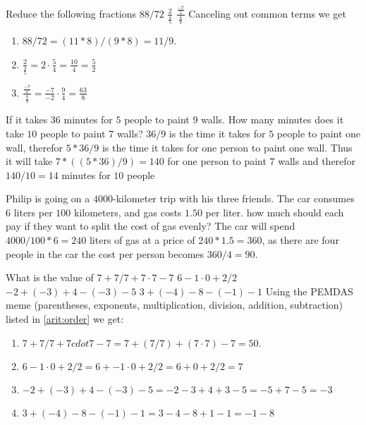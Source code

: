 \begin{ExerciseList}

\Exercise Reduce the following fractions
\Question $88/72$
\Question $\frac{2}{\frac{4}{5}}$
\Question $\frac{\frac{-7}{2}}{\frac{4}{9}}$
\Answer Canceling out common terms we get
\begin{enumerate}
\item\myindent $88/72 = (11*8)/(9*8) = 11/9$.
\item\myindent $\frac{2}{\frac{4}{5}} = 2 \cdot \frac{5}{4} = \frac{10}{4} = \frac{5}{2}$
\item\myindent $\frac{\frac{-7}{2}}{\frac{4}{9}} = \frac{-7}{-2} \cdot \frac{9}{4} = \frac{63}{8}$
\end{enumerate}

\Exercise If it takes 36 minutes for $5$ people to paint $9$ walls. How many minutes does it take $10$ people to paint $7$ walls?
\Answer $36/9$ is the time it takes for $5$ people to paint one wall, therefor $5 * 36/9$ is the time it takes for one person to paint one wall. Thus it will take $7 * ((5 * 36)/9) = 140$ for one person to paint $7$ walls and therefor $140/10 = 14$ minutes for $10$ people

\Exercise Philip is going on a $4000$-kilometer trip with his three friends. The car consumes $6$ liters per $100$ kilometers, and gas costs $1.50$ per liter. how much should each pay if they want to split the cost of gas evenly?
\Answer The car will spend $4000/100 * 6 = 240$ liters of gas at a price of $240 * 1.5 = 360$, as there are four people in the car the cost per person becomes $360/4 = 90$.

\Exercise What is the value of
\Question $7 + 7/7 + 7 \cdot 7 - 7$
\Question $6 -1 \cdot 0 + 2/2$
\Question $-2 + (-3) + 4 - (-3) - 5$
\Question $3 + (-4) - 8 - (-1) - 1$
\Answer Using the PEMDAS meme (parentheses, exponents, multiplication, division, addition, subtraction) listed in \ref{arit:order} we get:
\begin{enumerate}
 \item\myindent $7 + 7/7 + 7 cdot 7 - 7 = 7 + (7/7) + (7 \cdot 7) - 7 = 50$.
 \item\myindent $6 - 1 \cdot 0 + 2/2 = 6 + -1 \cdot 0 + 2/2 = 6 + 0 + 2/2 = 7$
 \item\myindent $-2 + (-3) + 4 - (-3) - 5 = -2 - 3 + 4 + 3 - 5 = -5 + 7 - 5 = -3$
 \item\myindent $3 + (-4) - 8 - (-1) - 1 = 3 - 4 - 8 + 1 - 1 = -1 - 8 $
\end{enumerate}


\end{ExerciseList}
